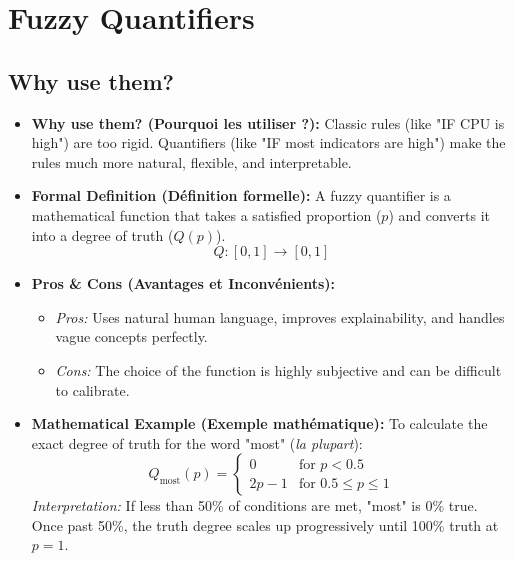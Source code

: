 \documentclass[11pt,a4paper]{article}
\begin{document}
\newpage
\section{Fuzzy Quantifiers}

\subsection{Why use them?}
\begin{itemize}
    \item \textbf{Why use them? (Pourquoi les utiliser ?):} Classic rules (like "IF CPU is high") are too rigid. Quantifiers (like "IF most indicators are high") make the rules much more natural, flexible, and interpretable.
    \item \textbf{Formal Definition (Définition formelle):} A fuzzy quantifier is a mathematical function that takes a satisfied proportion ($p$) and converts it into a degree of truth ($Q(p)$).
    \[ Q: [0, 1] \rightarrow [0, 1] \]
    \item \textbf{Pros \& Cons (Avantages et Inconvénients):}
    \begin{itemize}
        \item \textit{Pros:} Uses natural human language, improves explainability, and handles vague concepts perfectly.
        \item \textit{Cons:} The choice of the function is highly subjective and can be difficult to calibrate.
    \end{itemize}
    \item \textbf{Mathematical Example (Exemple mathématique):} To calculate the exact degree of truth for the word "most" (\textit{la plupart}):
    \[
    Q_{\text{most}}(p) = 
    \begin{cases} 
      0 & \text{for } p < 0.5 \\
      2p - 1 & \text{for } 0.5 \leq p \leq 1 
    \end{cases}
    \]
    \textit{Interpretation:} If less than 50\% of conditions are met, "most" is 0\% true. Once past 50\%, the truth degree scales up progressively until 100\% truth at $p=1$.
\end{itemize}
\end{document}
